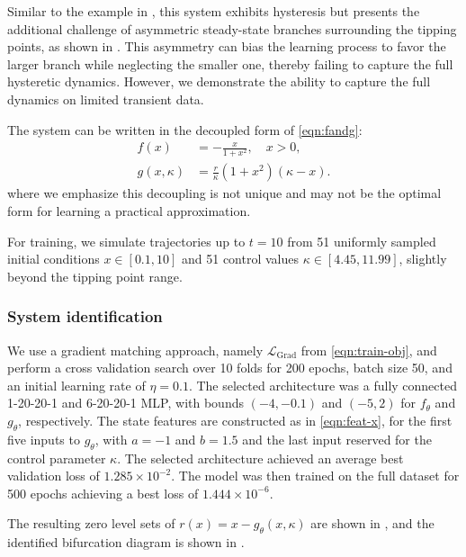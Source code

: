 \documentclass[11pt,twoside]{article}
\theoremstyle{plain}
\theoremstyle{definition}
\theoremstyle{remark}
\begin{document}
Similar to the example in , this system exhibits hysteresis but presents the additional challenge of asymmetric steady-state branches surrounding the tipping points, as shown in . This asymmetry can bias the learning process to favor the larger branch while neglecting the smaller one, thereby failing to capture the full hysteretic dynamics. However, we demonstrate the ability to capture the full dynamics on limited transient data.

The system can be written in the decoupled form of \cref{eqn:fandg}:
\begin{equation}
    \begin{split}
        f(x) &= -\frac{x}{1+x^2}, \quad x > 0,\\
        g(x,\kappa) &= \frac{r}{\kappa}(1+x^2)(\kappa-x).
    \end{split}
\end{equation}
where we emphasize this decoupling is not unique and may not be the optimal form for learning a practical approximation.

For training, we simulate trajectories  up to \(t = 10\) from 51 uniformly sampled initial conditions \(x \in [0.1,10]\) and 51 control values \(\kappa \in [4.45, 11.99]\), slightly beyond the tipping point range. 

\subsubsection*{System identification} 
We use a gradient matching approach, namely \(\mathcal{L}_{\text{Grad}}\) from \cref{eqn:train-obj}, and perform a cross validation search over 10 folds for 200 epochs, batch size 50, and  an initial learning rate of \(\eta = 0.1\). The selected architecture was a fully connected 1-20-20-1 and 6-20-20-1 MLP, with bounds \((-4,-0.1)\) and \((-5,2)\) for \(f_\theta\) and \(g_\theta\), respectively. 
 The state features are constructed as in \cref{eqn:feat-x}, for the first five inputs to \(g_\theta\), with \(a=-1\) and \(b=1.5\) and the last input reserved for the control parameter \(\kappa\). The selected architecture achieved an average best validation loss of \(1.285 \times 10^{-2}\). The model was then trained on the full dataset for 500 epochs achieving a best loss of \(1.444 \times 10^{-6}\).

 The resulting zero level sets of \(r(x) = x - g_\theta(x,\kappa)\) are shown in , and the identified bifurcation diagram is shown in .
\end{document}
